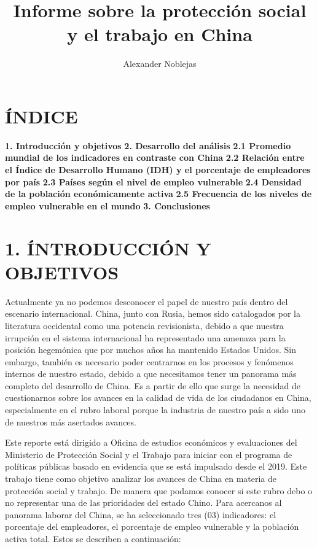 \documentclass[
]{article}
\title{Informe sobre la protección social y el trabajo en China}
\author{Alexander Noblejas}
\date{}
\begin{document}
\maketitle

\hypertarget{uxedndice}{%
\section{ÍNDICE}\label{uxedndice}}

\textbf{1. Introducción y objetivos} \textbf{2. Desarrollo del análisis}
\textbf{2.1 Promedio mundial de los indicadores en contraste con China}
\textbf{2.2 Relación entre el Índice de Desarrollo Humano (IDH) y el
porcentaje de empleadores por país} \textbf{2.3 Países según el nivel de
empleo vulnerable} \textbf{2.4 Densidad de la población económicamente
activa} \textbf{2.5 Frecuencia de los niveles de empleo vulnerable en el
mundo} \textbf{3. Conclusiones}

\hypertarget{uxedntroducciuxf3n-y-objetivos}{%
\section{1. ÍNTRODUCCIÓN Y
OBJETIVOS}\label{uxedntroducciuxf3n-y-objetivos}}

Actualmente ya no podemos desconocer el papel de nuestro país dentro del
escenario internacional. China, junto con Rusia, hemos sido catalogados
por la literatura occidental como una potencia revisionista, debido a
que nuestra irrupción en el sistema internacional ha representado una
amenaza para la posición hegemónica que por muchos años ha mantenido
Estados Unidos. Sin embargo, también es necesario poder centrarnos en
los procesos y fenómenos internos de nuestro estado, debido a que
necesitamos tener un panorama más completo del desarrollo de China. Es a
partir de ello que surge la necesidad de cuestionarnos sobre los avances
en la calidad de vida de los ciudadanos en China, especialmente en el
rubro laboral porque la industria de nuestro país a sido uno de nuestros
más asertados avances.

Este reporte está dirigido a Oficina de estudios económicos y
evaluaciones del Ministerio de Protección Social y el Trabajo para
iniciar con el programa de políticas públicas basado en evidencia que se
está impulsado desde el 2019. Este trabajo tiene como objetivo analizar
los avances de China en materia de protección social y trabajo. De
manera que podamos conocer si este rubro debo o no representar una de
las prioridades del estado Chino. Para acercanos al panorama laborar del
China, se ha seleccionado tres (03) indicadores: el porcentaje del
empleadores, el porcentaje de empleo vulnerable y la población activa
total. Estos se describen a continuación:
\end{document}
